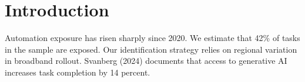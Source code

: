 \section{Introduction}
Automation exposure has risen sharply since 2020. %
We estimate that 42\% of tasks in the sample are exposed.
Our identification strategy relies on regional variation in broadband rollout.
Svanberg (2024) documents that access to generative AI increases task completion by 14 percent.
